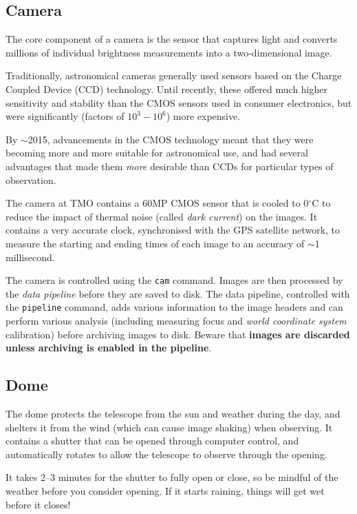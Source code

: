 \documentclass[12pt,a4paper]{article}
\begin{document}
\subsection{Camera}

The core component of a camera is the sensor that captures light and converts millions of individual brightness measurements into a two-dimensional image.

Traditionally, astronomical cameras generally used sensors based on the Charge Coupled Device (CCD) technology. Until recently, these offered much higher sensitivity and stability than the CMOS sensors used in consumer electronics, but were significantly (factors of $10^3 - 10^6$) more expensive.

By $\sim$2015, advancements in the CMOS technology meant that they were becoming more and more suitable for astronomical use, and had several advantages that made them \emph{more} desirable than CCDs for particular types of observation.

The camera at TMO contains a 60MP CMOS sensor that is cooled to 0$^\circ$C to reduce the impact of thermal noise (called \emph{dark current}) on the images. It contains a very accurate clock, synchronised with the GPS satellite network, to measure the starting and ending times of each image to an accuracy of $\sim$1 millisecond.

The camera is controlled using the \texttt{cam} command. Images are then processed by the \emph{data pipeline} before they are saved to disk. The data pipeline, controlled with the \texttt{pipeline} command, adds various information to the image headers and can perform various analysis (including measuring focus and \emph{world coordinate system} calibration) before archiving images to disk. Beware that \textbf{images are discarded unless archiving is enabled in the pipeline}.

\subsection{Dome}

The dome protects the telescope from the sun and weather during the day, and shelters it from the wind (which can cause image shaking) when observing. It contains a shutter that can be opened through computer control, and automatically rotates to allow the telescope to observe through the opening.

It takes 2--3 minutes for the shutter to fully open or close, so be mindful of the weather before you consider opening. If it starts raining, things will get wet before it closes!
\end{document}
